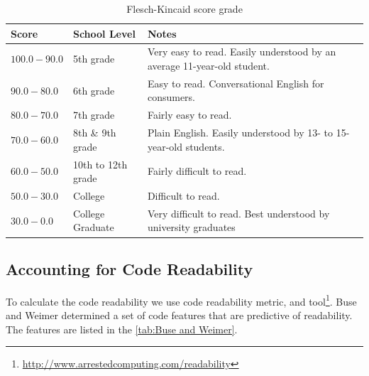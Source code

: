 \documentclass[12pt,mscthesis]{usiinfthesis}
\begin{document}
	\begin {table}[H]
	\begin{center}
    \begin{tabular}{| l | l | p{7cm} | }
    \hline
    \textbf{Score} & \textbf{School Level} & \textbf{Notes} \\ \hline
    $100.0-90.0$ & 5th grade & Very easy to read. Easily understood by an average 11-year-old student.\\ \hline
    $90.0-80.0$ & 6th grade & Easy to read. Conversational English for consumers.\\ \hline
 	$80.0-70.0$ & 7th grade & Fairly easy to read. \\ \hline
	$70.0-60.0$ & 8th \& 9th grade & Plain English. Easily understood by 13- to 15-year-old students.\\ \hline
	$60.0-50.0$ & 10th to 12th grade &  Fairly difficult to read.\\ \hline
	$50.0-30.0$ & College & Difficult to read.\\ \hline
	$30.0-0.0$ & College Graduate & Very difficult to read. Best understood by university graduates\\\hline

    \end{tabular}
	\end{center}
	\caption{Flesch-Kincaid score grade} \label{tab:Flesch-Kincaid} 
	\end{table}

\subsection{Accounting for Code Readability}

	To calculate the code readability we use \citet{Buse:2010:LMC:1850489.1850615} code readability metric, and tool\footnote{\url{http://www.arrestedcomputing.com/readability}}.
	 Buse and Weimer determined a set of code features that are predictive of readability. The features are listed in the \cref{tab:Buse and Weimer}.
\end{document}
